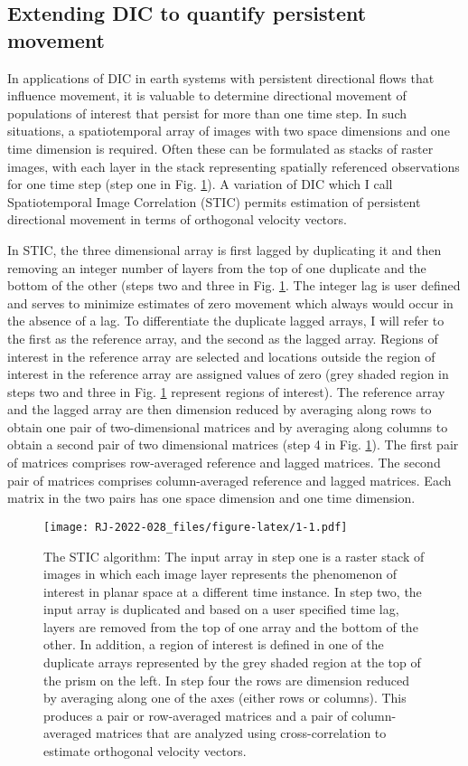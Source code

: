 \hypertarget{extending-dic-to-quantify-persistent-movement}{%
\subsection{Extending DIC to quantify persistent movement}\label{extending-dic-to-quantify-persistent-movement}}

In applications of DIC in earth systems with persistent directional flows that influence movement, it is valuable to determine directional movement of populations of interest that persist for more than one time step. In such situations, a spatiotemporal array of images with two space dimensions and one time dimension is required. Often these can be formulated as stacks of raster images, with each layer in the stack representing spatially referenced observations for one time step (step one in Fig. \ref{fig:1}). A variation of DIC which I call Spatiotemporal Image Correlation (STIC) permits estimation of persistent directional movement in terms of orthogonal velocity vectors.

In STIC, the three dimensional array is first lagged by duplicating it and then removing an integer number of layers from the top of one duplicate and the bottom of the other (steps two and three in Fig. \ref{fig:1}. The integer lag is user defined and serves to minimize estimates of zero movement which always would occur in the absence of a lag. To differentiate the duplicate lagged arrays, I will refer to the first as the reference array, and the second as the lagged array. Regions of interest in the reference array are selected and locations outside the region of interest in the reference array are assigned values of zero (grey shaded region in steps two and three in Fig. \ref{fig:1} represent regions of interest). The reference array and the lagged array are then dimension reduced by averaging along rows to obtain one pair of two-dimensional matrices and by averaging along columns to obtain a second pair of two dimensional matrices (step 4 in Fig. \ref{fig:1}). The first pair of matrices comprises row-averaged reference and lagged matrices. The second pair of matrices comprises column-averaged reference and lagged matrices. Each matrix in the two pairs has one space dimension and one time dimension.

\begin{figure}
\centering
\texttt{[image: RJ-2022-028\_files/figure-latex/1-1.pdf]}
\caption{\label{fig:1}The STIC algorithm: The input array in step one is a raster stack of images in which each image layer represents the phenomenon of interest in planar space at a different time instance. In step two, the input array is duplicated and based on a user specified time lag, layers are removed from the top of one array and the bottom of the other. In addition, a region of interest is defined in one of the duplicate arrays represented by the grey shaded region at the top of the prism on the left. In step four the rows are dimension reduced by averaging along one of the axes (either rows or columns). This produces a pair or row-averaged matrices and a pair of column-averaged matrices that are analyzed using cross-correlation to estimate orthogonal velocity vectors.}
\end{figure}

